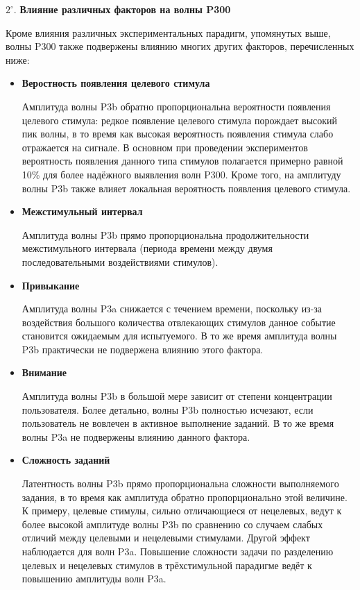 \documentclass[12pt,fleqn]{article}
\begin{document}
	\par $2^{\circ}.$ {\bf Влияние различных факторов на волны P300}
	\par Кроме влияния различных экспериментальных парадигм, упомянутых выше, волны P300 также подвержены влиянию многих других факторов, перечисленных ниже:
	\begin{itemize}
	\item
	{\bf Веростность появления целевого стимула}
	\par Амплитуда волны P3b обратно пропорциональна вероятности появления целевого стимула: редкое появление целевого стимула порождает высокий пик волны, в то время как высокая вероятность появления стимула слабо отражается на сигнале. В основном при проведении экспериментов вероятность появления данного типа стимулов полагается примерно равной 10\% для более надёжного выявления волн P300.  Кроме того, на амплитуду волны P3b также влияет локальная вероятность появления целевого стимула.
	\item
	{\bf Межстимульный интервал}
	\par Амплитуда волны P3b прямо пропорциональна продолжительности межстимульного интервала (периода времени между двумя последовательными воздействиями стимулов).
	\item
	{\bf Привыкание}
	\par Амплитуда волны P3a снижается с течением времени, поскольку из-за воздействия большого количества отвлекающих стимулов данное событие становится ожидаемым для испытуемого. В то же время амплитуда волны P3b практически не подвержена влиянию этого фактора.
	\item
	{\bf Внимание}
	\par Амплитуда волны P3b в большой мере зависит от степени концентрации пользователя. Более детально, волны P3b полностью исчезают, если пользователь не вовлечен в активное выполнение заданий. В то же время волны P3a не подвержены влиянию данного фактора.
	\item
	{\bf Сложность заданий}
	\par Латентность волны P3b прямо пропорциональна сложности выполняемого  задания, в то время как амплитуда обратно пропорционально этой величине. К примеру, целевые стимулы, сильно отличающиеся от нецелевых, ведут к более высокой амплитуде волны P3b по сравнению со случаем слабых отличий между целевыми и нецелевыми стимулами.  Другой эффект наблюдается для волн P3a. Повышение сложности задачи по разделению целевых и нецелевых стимулов в трёхстимульной парадигме ведёт к повышению амплитуды волн P3a.
	\end{itemize}
\end{document}
